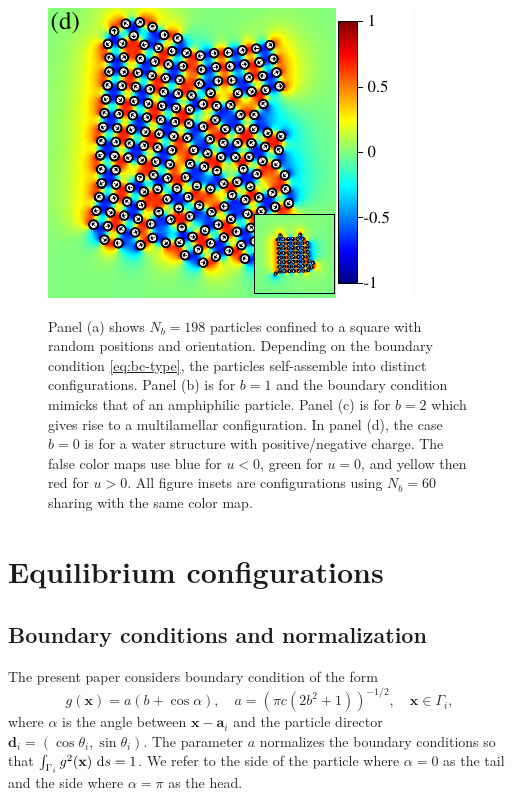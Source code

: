 \documentclass[aps,prl,preprint,groupedaddress]{revtex4-2}
\renewcommand{\aa}{\mathbf{a}}
\newcommand{\dd}{\mathbf{d}}
\newcommand{\xx}{\mathbf{x}}
\begin{document}
\begin{figure}[h!]
\begin{center}
  \includegraphics[height=0.27\textheight]{Nb198d_eta_inset.pdf}
\end{center}
\begin{caption}{\label{fig:relax}
  Panel (a) shows $N_b = 198$ particles confined to a square with random 
  positions and orientation.
  Depending on the boundary condition \eqref{eq:bc-type},
  the particles self-assemble into distinct configurations.
  Panel (b) is for $b=1$ and the boundary condition mimicks that
  of an amphiphilic particle. 
  Panel (c) is for $b=2$ which gives rise to a multilamellar configuration. 
  In panel (d), the case $b = 0$ is for a water structure with
  positive/negative charge. 
  The false color maps use blue for $u < 0$, green for $u = 0$, and yellow then red for $u > 0$.
    All figure insets are configurations using $N_b=60$ sharing with the same color map.}
\end{caption}
\end{figure}

\section{Equilibrium configurations}
\subsection{Boundary conditions and normalization}
The present paper considers boundary condition of the form
\begin{equation}
  \label{eq:bc-type}
g(\xx) = a(b + \cos \alpha),\quad a = (\pi c(2b^2 + 1))^{-1/2},\quad \xx \in \Gamma_i,
\end{equation}
where $\alpha$ is the angle between $\xx - \aa_i$ and the particle director
$\dd_i = (\cos \theta_i, \sin \theta_i)$.
The parameter $a$ normalizes the boundary conditions 
so that $\int_{\Gamma_i} g^2(\xx) \, \dif s = 1$.
We refer to the side of the particle where $\alpha = 0$
as the tail and the side where $\alpha = \pi$ as the head. 
\end{document}
